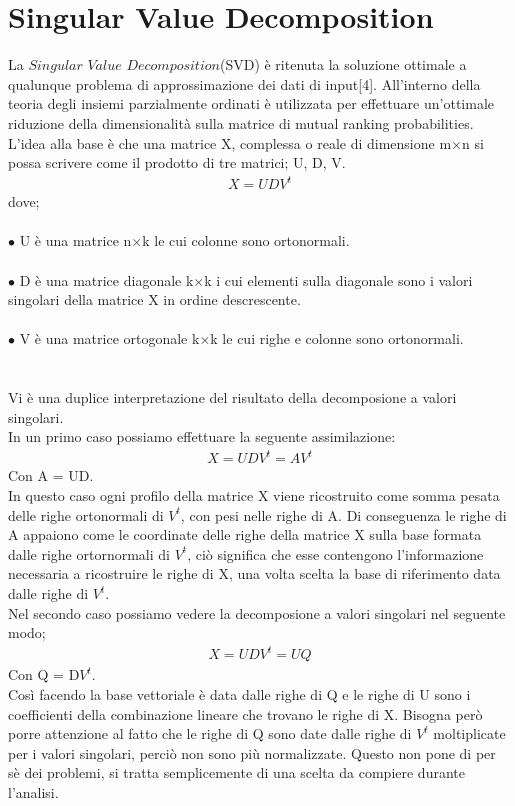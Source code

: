 \documentclass[a4paper,12pt, openright]{report}
\begin{document}
\section{Singular Value Decomposition}


La $\textit{Singular Value Decomposition}$(SVD) è ritenuta la soluzione ottimale a qualunque problema di approssimazione
dei dati di input[4]. All'interno della teoria degli insiemi parzialmente ordinati è utilizzata per effettuare
un'ottimale riduzione della dimensionalità sulla matrice di mutual ranking probabilities. L'idea alla base 
è che una matrice X, complessa o reale di dimensione m$\times$n si possa scrivere come il prodotto
di tre matrici; U, D, V. 
\begin{align}
    X = UDV^t
\end{align}
dove; \\
\\
$\bullet$ U è una matrice n$\times$k le cui colonne sono ortonormali.\\
\\
$\bullet$ D è una matrice diagonale k$\times$k i cui elementi sulla diagonale sono i valori singolari della matrice X 
in ordine descrescente. \\
\\
$\bullet$ V è una matrice ortogonale k$\times$k le cui righe e colonne sono ortonormali. \\
\\
\\
Vi è una duplice interpretazione del risultato della decomposione a valori singolari. \\
In un primo caso possiamo effettuare la seguente assimilazione: 
\begin{align}
    X = UDV^t = AV^t
\end{align}
Con A = UD.\\
In questo caso ogni profilo della matrice X viene ricostruito come somma pesata delle righe 
ortonormali di $V^t$, con pesi nelle righe di A. Di conseguenza le righe di A appaiono come le coordinate 
delle righe della matrice X sulla base formata dalle righe ortornormali di $V^t$, ciò significa che 
esse contengono l'informazione necessaria a ricostruire le righe di X, una volta scelta la base di riferimento
data dalle righe di $V^t$. \\
Nel secondo caso possiamo vedere la decomposione a valori singolari nel seguente modo; 
\begin{align}
    X = UDV^t = UQ
\end{align}
Con Q = D$V^t$. \\
Così facendo la base vettoriale è data dalle righe di Q e le righe di U sono i coefficienti
della combinazione lineare che trovano le righe di X. Bisogna però porre attenzione al fatto che le 
righe di Q sono date dalle righe di $V^t$ moltiplicate per i valori singolari, perciò non sono più 
normalizzate. Questo non pone di per sè dei problemi, si tratta semplicemente di una scelta da compiere 
durante l'analisi. \\
\end{document}
